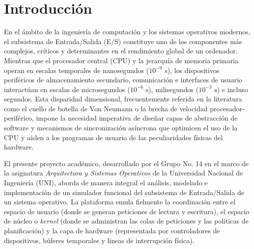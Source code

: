 \documentclass[11pt,letterpaper]{article}
\begin{document}
\setcounter{page}{1}

\tableofcontents
\newpage
\listoffigures
\vspace{1cm}
\listoftables
\newpage

\setcounter{page}{1}

\section{Introducción}

En el ámbito de la ingeniería de computación y los sistemas operativos modernos, el subsistema de Entrada/Salida (E/S) constituye uno de los componentes más complejos, críticos y determinantes en el rendimiento global de un ordenador. Mientras que el procesador central (CPU) y la jerarquía de memoria primaria operan en escalas temporales de nanosegundos ($10^{-9}\text{ s}$), los dispositivos periféricos de almacenamiento secundario, comunicación e interfaces de usuario interactúan en escalas de microsegundos ($10^{-6}\text{ s}$), milisegundos ($10^{-3}\text{ s}$) e incluso segundos. Esta disparidad dimensional, frecuentemente referida en la literatura como el cuello de botella de Von Neumann o la brecha de velocidad procesador-periférico, impone la necesidad imperativa de diseñar capas de abstracción de software y mecanismos de sincronización asíncrona que optimicen el uso de la CPU y aíslen a los programas de usuario de las peculiaridades físicas del hardware.

El presente proyecto académico, desarrollado por el Grupo No. 14 en el marco de la asignatura \textit{Arquitectura y Sistemas Operativos} de la Universidad Nacional de Ingeniería (UNI), aborda de manera integral el análisis, modelado e implementación de un simulador funcional del subsistema de Entrada/Salida de un sistema operativo. La plataforma emula fielmente la coordinación entre el espacio de usuario (donde se generan peticiones de lectura y escritura), el espacio de núcleo o \textit{kernel} (donde se administran las colas de peticiones y las políticas de planificación) y la capa de hardware (representada por controladores de dispositivos, búferes temporales y líneas de interrupción física).
\end{document}
